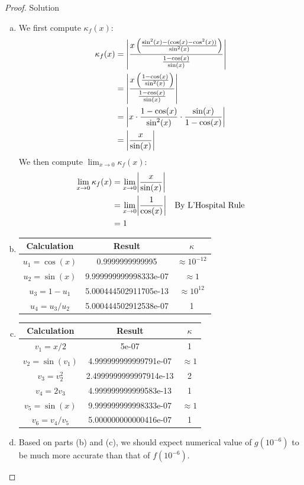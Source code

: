 \documentclass{article}
\DeclarePairedDelimiter{\abs}{\lvert}{\rvert}
\theoremstyle{definition}
\begin{document}
\begin{proof}{Solution}
\begin{enumerate}[(a)]
\item We first compute $\kappa_f(x)$:
\begin{align*}
    \kappa_f(x) &= \abs*{\frac{x\left(\frac{\sin^2(x) - (\cos(x) - \cos^2(x))}{\sin^2(x)}\right)}{\frac{1 - \cos(x)}{\sin(x)}}} \\
    &= \abs*{\frac{x\left(\frac{1-\cos(x)}{\sin^2(x)}\right)}{\frac{1 - \cos(x)}{\sin(x)}}} \\
    &= \abs*{x \cdot \frac{1-\cos(x)}{\sin^2(x)} \cdot \frac{\sin(x)}{1 - \cos(x)}} \\
    &= \abs*{\frac{x}{\sin(x)}}
\end{align*}
We then compute $\lim_{x \rightarrow 0} \kappa_f(x)$:
\begin{align*}
    \lim_{x \rightarrow 0} \kappa_f(x) &= \lim_{x \rightarrow 0} \abs*{\frac{x}{\sin(x)}} \\
    &= \lim_{x \rightarrow 0} \abs*{\frac{1}{\cos(x)}} & \text{By L'Hospital Rule}\\
    &= 1
\end{align*}
\item
\begin{tabular}{c | c | c}
    Calculation & Result & $\kappa$ \\\hline
    $u_1 = \cos(x)$ & 0.9999999999995 & $\approx 10^{-12}$ \\
    $u_2 = \sin(x)$ & 9.999999999998333e-07 & $\approx 1$ \\
    $u_3 = 1 - u_1$ & 5.000444502911705e-13 & $\approx 10^{12}$ \\
    $u_4 = u_3/u_2$ & 5.000444502912538e-07 & 1
\end{tabular}
\item \begin{tabular}{c | c | c}
    Calculation & Result & $\kappa$ \\\hline
    $v_1 = x/2$ & 5e-07 & 1 \\
    $v_2 = \sin(v_1)$ & 4.999999999999791e-07 & $\approx 1$ \\
    $v_3 = v_2^2$ & 2.4999999999997914e-13 & 2 \\
    $v_4 = 2v_3$ & 4.999999999999583e-13 & 1 \\
    $v_5 = \sin(x)$ & 9.999999999998333e-07 & $\approx 1$ \\
    $v_6 = v_4/v_5$ & 5.000000000000416e-07 & 1
\end{tabular}
\item Based on parts (b) and (c), we should expect numerical value of $g(10^{-6})$ to be much more accurate than that of $f(10^{-6})$.
\end{enumerate}


\end{proof}
\end{document}
